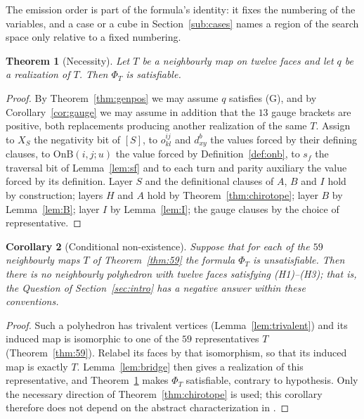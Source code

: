 \documentclass[11pt,reqno]{amsart}
\theoremstyle{plain}
\newtheorem{theorem}{Theorem}[section]
\newtheorem{corollary}[theorem]{Corollary}
\theoremstyle{definition}
\newcommand{\bra}[1]{[#1]}
\newcommand{\OnB}{\mathrm{OnB}}
\begin{document}
The emission order is part of the formula's identity: it fixes the numbering of the variables, and a
case or a cube in Section~\ref{sub:cases} names a region of the search space only relative to a fixed
numbering.

\begin{theorem}[Necessity]\label{thm:necessity}
Let $T$ be a neighbourly map on twelve faces and let $q$ be a realization of $T$. Then $\Phi_T$ is
satisfiable.
\end{theorem}

\begin{proof}
By Theorem~\ref{thm:genpos} we may assume $q$ satisfies (G), and by Corollary~\ref{cor:gauge} we may
assume in addition that the $13$ gauge brackets are positive, both replacements producing another
realization of the same $T$. Assign to $X_S$ the negativity bit of $\bra{S}$, to $o^{ij}_{kl}$ and
$d^b_{xy}$ the values forced by their defining clauses, to $\OnB(i,j;u)$ the value forced by
Definition~\ref{def:onb}, to $s_f$ the traversal bit of Lemma~\ref{lem:sf} and to each turn and parity
auxiliary the value forced by its definition. Layer $S$ and the definitional clauses of $A$, $B$ and
$I$ hold by construction; layers $H$ and $A$ hold by Theorem~\ref{thm:chirotope}; layer $B$ by
Lemma~\ref{lem:B}; layer $I$ by Lemma~\ref{lem:I}; the gauge clauses by the choice of representative.
\end{proof}

\begin{corollary}[Conditional non-existence]\label{cor:conditional}
Suppose that for each of the $59$ neighbourly maps $T$ of Theorem~\ref{thm:59} the formula $\Phi_T$ is
unsatisfiable. Then there is no neighbourly polyhedron with twelve faces satisfying
\textup{(H1)}--\textup{(H3)}; that is, the Question of Section~\ref{sec:intro} has a negative answer
within these conventions.
\end{corollary}

\begin{proof}
Such a polyhedron has trivalent vertices (Lemma~\ref{lem:trivalent}) and its induced map is
isomorphic to one of the $59$ representatives $T$ (Theorem~\ref{thm:59}). Relabel its faces by
that isomorphism, so that its induced map is exactly $T$. Lemma~\ref{lem:bridge} then gives a
realization of this representative, and Theorem~\ref{thm:necessity} makes $\Phi_T$ satisfiable,
contrary to hypothesis. Only the necessary direction of Theorem~\ref{thm:chirotope} is used;
this corollary therefore does not depend on the abstract characterization in \cite{BLSWZ1999}.
\end{proof}
\end{document}
